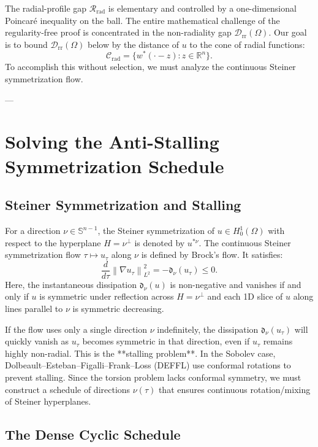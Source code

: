 \documentclass[11pt]{article}
\theoremstyle{definition}
\newcommand{\R}{\mathbb R}
\newcommand{\Om}{\Omega}
\newcommand{\Drr}{\mathcal D_{\mathrm{rr}}}
\newcommand{\Rrad}{\mathcal R_{\mathrm{rad}}}
\newcommand{\Sph}{\mathbb S^{n-1}}
\newcommand{\norm}[1]{\left\|#1\right\|}
\begin{document}
The radial-profile gap $\Rrad$ is elementary and controlled by a one-dimensional Poincaré inequality on the ball. The entire mathematical challenge of the regularity-free proof is concentrated in the non-radiality gap $\Drr(\Om)$. Our goal is to bound $\Drr(\Om)$ below by the distance of $u$ to the cone of radial functions:
\begin{equation}
\mathcal{C}_{\mathrm{rad}} = \{ w^*(\cdot - z) : z \in \R^n \}.
\end{equation}
To accomplish this without selection, we must analyze the continuous Steiner symmetrization flow.

---

\section{Solving the Anti-Stalling Symmetrization Schedule}

\subsection{Steiner Symmetrization and Stalling}

For a direction $\nu \in \Sph$, the Steiner symmetrization of $u \in H^1_0(\Om)$ with respect to the hyperplane $H = \nu^\perp$ is denoted by $u^{*\nu}$. The continuous Steiner symmetrization flow $\tau \mapsto u_\tau$ along $\nu$ is defined by Brock's flow. It satisfies:
\begin{equation}
\frac{d}{d\tau} \norm{\nabla u_\tau}_{L^2}^2 = - \mathfrak{d}_\nu(u_\tau) \le 0.
\end{equation}
Here, the instantaneous dissipation $\mathfrak{d}_\nu(u)$ is non-negative and vanishes if and only if $u$ is symmetric under reflection across $H = \nu^\perp$ and each 1D slice of $u$ along lines parallel to $\nu$ is symmetric decreasing.

If the flow uses only a single direction $\nu$ indefinitely, the dissipation $\mathfrak{d}_\nu(u_\tau)$ will quickly vanish as $u_\tau$ becomes symmetric in that direction, even if $u_\tau$ remains highly non-radial. This is the **stalling problem**. In the Sobolev case, Dolbeault--Esteban--Figalli--Frank--Loss (DEFFL) use conformal rotations to prevent stalling. Since the torsion problem lacks conformal symmetry, we must construct a schedule of directions $\nu(\tau)$ that ensures continuous rotation/mixing of Steiner hyperplanes.

\subsection{The Dense Cyclic Schedule}
\end{document}
